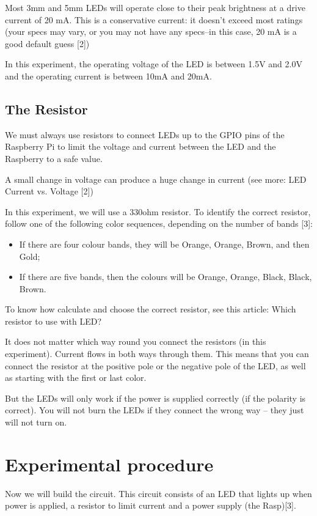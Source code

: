 \documentclass[10pt,twoside,english]{_support/latex/sbabook/sbabook}
\begin{document}
Most 3mm and 5mm LEDs will operate close to their peak brightness at a drive current of 20 mA. This is a conservative current: it doesn’t exceed most ratings (your specs may vary, or you may not have any specs–in this case, 20 mA is a good default guess {[}2{]})

In this experiment, the operating voltage of the LED is between 1.5V and 2.0V and the operating current is between 10mA and 20mA.
\subsection{The Resistor}
We must always use resistors to connect LEDs up to the GPIO pins of the Raspberry Pi to limit the voltage and current between the LED and the Raspberry to a safe value.

A small change in voltage can produce a huge change in current (see more: LED Current vs. Voltage {[}2{]})

In this experiment, we will use a 330ohm resistor. To identify the correct resistor, follow one of the following color sequences, depending on the number of bands {[}3{]}:

\begin{itemize}
\item If there are four colour bands, they will be Orange, Orange, Brown, and then Gold;
\item If there are five bands, then the colours will be Orange, Orange, Black, Black, Brown.
\end{itemize}

To know how calculate and choose the correct resistor, see this article: Which resistor to use with LED?

It does not matter which way round you connect the resistors (in this experiment). Current flows in both ways through them. This means that you can connect the resistor at the positive pole or the negative pole of the LED, as well as starting with the first or last color.

But the LEDs will only work if the power is supplied correctly (if the polarity is correct). You will not burn the LEDs if they connect the wrong way – they just will not turn on.
\section{Experimental procedure}
Now we will build the circuit. This circuit consists of an LED that lights up when power is applied, a resistor to limit current and a power supply (the Rasp){[}3{]}.
\end{document}
